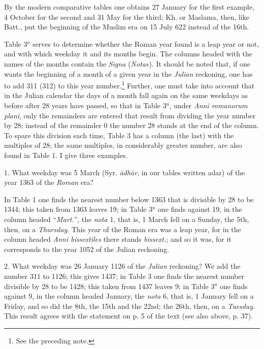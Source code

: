 \documentclass[11pt]{article}
\newcommand{\Pg}[1]{\marginpar{\footnotesize\color{gray}#1}}
\begin{document}
\par By the modern comparative tables one obtains 27 January for the first example, 4 October for the second and 31 May for the third; Kh. or Maslama, then, like Batt., put the beginning of the Muslim era on 15 July 622 instead of the 16th.\par
\par \Pg{40}Table 3$^{a}$ serves to determine whether the Roman year found is a leap year or not, and with which weekday it and its months begin. The columns headed with the names of the months contain the \emph{Signa} (\emph{Notae}). It should be noted that, if one wants the beginning of a month of a given year in the \emph{Julian} reckoning, one has to add 311 (312) to this year number.\footnote{See the preceding note.} Further, one must take into account that in the Julian calendar the days of a month fall again on the same weekdays as before after 28 years have passed, so that in Table 3$^{a}$, under \emph{Anni romanorum plani}, only the remainders are entered that result from dividing the year number by 28; instead of the remainder 0 the number 28 stands at the end of the column. To spare this division each time, Table 3 has a column (the last) with the multiples of 28; the same multiples, in considerably greater number, are also found in Table 1. I give three examples.\par
\par 1. What weekday was 5 March (Syr. \emph{ādhār}, in our tables written adar) of the year 1363 of the \emph{Roman} era?\par
\par In Table 1 one finds the nearest number below 1363 that is divisible by 28 to be 1344; this taken from 1363 leaves 19; in Table 3$^{a}$ one finds against 19, in the column headed “\emph{Mart.}”, the \emph{nota} 1, that is, 1 March fell on a Sunday, the 5th, then, on a \emph{Thursday}. This year of the Roman era was a leap year, for in the column headed \emph{Anni bissextiles} there stands \emph{bissext.}; and so it was, for it corresponds to the year 1052 of the Julian reckoning.\par
\par 2. What weekday was 26 January 1126 of the \emph{Julian} reckoning? We add the number 311 to 1126; this gives 1437; in Table 3 one finds the nearest number divisible by 28 to be 1428; this taken from 1437 leaves 9; in Table 3$^{a}$ one finds against 9, in the column headed January, the \emph{nota} 6, that is, 1 January fell on a Friday, and so did the 8th, the 15th and the 22nd; the 26th, then, on a \emph{Tuesday}. This result agrees with the statement on p. 5 of the text (see also above, p. 37).\par
\end{document}
